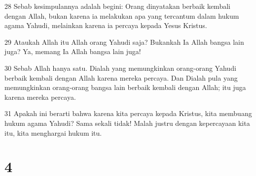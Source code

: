 \par 28 Sebab kesimpulannya adalah begini: Orang dinyatakan berbaik kembali dengan Allah, bukan karena ia melakukan apa yang tercantum dalam hukum agama Yahudi, melainkan karena ia percaya kepada Yesus Kristus.
\par 29 Ataukah Allah itu Allah orang Yahudi saja? Bukankah Ia Allah bangsa lain juga? Ya, memang Ia Allah bangsa lain juga!
\par 30 Sebab Allah hanya satu. Dialah yang memungkinkan orang-orang Yahudi berbaik kembali dengan Allah karena mereka percaya. Dan Dialah pula yang memungkinkan orang-orang bangsa lain berbaik kembali dengan Allah; itu juga karena mereka percaya.
\par 31 Apakah ini berarti bahwa karena kita percaya kepada Kristus, kita membuang hukum agama Yahudi? Sama sekali tidak! Malah justru dengan kepercayaan kita itu, kita menghargai hukum itu.

\chapter{4}


